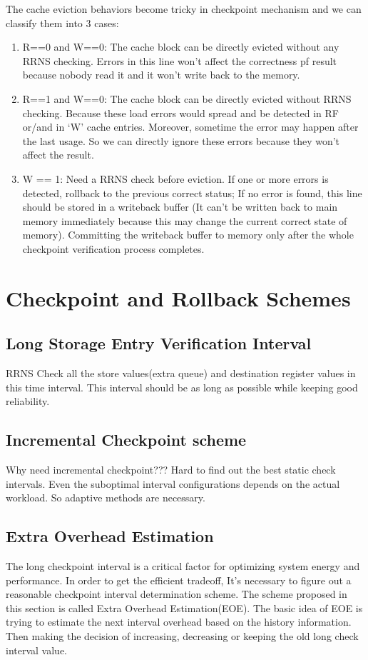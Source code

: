 \documentclass{sig-alternate}
\begin{document}
The cache eviction behaviors become tricky in checkpoint mechanism and we can classify them into 3 cases: 
\begin{enumerate}
\item R==0 and W==0: The cache block can be directly evicted without any RRNS checking. Errors in this line won't affect the correctness pf result because nobody read it and it won't write back to the memory.  
\item R==1 and W==0: The cache block can be directly evicted without RRNS checking. Because these load errors would spread and be detected in RF or/and in `W' cache entries. Moreover, sometime the error may happen after the last usage. So we can directly ignore these errors because they won't affect the result.  
\item W == 1: Need a RRNS check before eviction. If one or more errors is detected, rollback to the previous correct status; If no error is found, this line should be stored in a writeback buffer (It can't be written back to main memory immediately because this may change the current correct state of memory). Committing the writeback buffer to memory only after the whole checkpoint verification process completes.   
\end{enumerate}

\section{Checkpoint and Rollback Schemes}
\label{Chptschemes}
\subsection{Long Storage Entry Verification Interval}
RRNS Check all the store values(extra queue) and destination register values in this time interval. This interval should be as long as possible while keeping good reliability. 
\subsection{Incremental Checkpoint scheme}
 \label{Inc_chpt}
Why need incremental checkpoint???
Hard to find out the best static check intervals. Even the suboptimal interval configurations depends on the actual workload. So adaptive methods are necessary.

\subsection{Extra Overhead Estimation}
The long checkpoint interval is a critical factor for optimizing system energy and performance. In order to get the efficient tradeoff, It's necessary to figure out a reasonable checkpoint interval determination scheme. The scheme proposed in this section is called Extra Overhead Estimation(EOE). The basic idea of EOE is trying to estimate the next interval overhead based on the history information. Then making the decision of increasing, decreasing or keeping the old long check interval value. 
\end{document}
